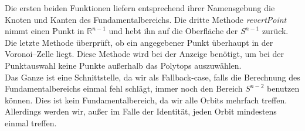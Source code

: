          \noindent Die ersten beiden Funktionen liefern entsprechend ihrer Namensgebung die Knoten und Kanten des Fundamentalbereichs. Die dritte Methode \emph{revertPoint} nimmt einen Punkt in $\mathbb{R}^{n-1}$ und
         hebt ihn auf die Oberfläche der $S^{n-1}$ zurück. Die letzte Methode überprüft, ob ein angegebener Punkt überhaupt in der Voronoi--Zelle liegt.
         Diese Methode wird bei der Anzeige benötigt, um bei der Punktauswahl keine Punkte außerhalb das Polytops auszuwählen.\\

         \noindent Das Ganze ist eine Schnittstelle, da wir als Fallback-case, falls die Berechnung des Fundamentalbereichs einmal fehl schlägt, immer noch 
         den Bereich $S^{n-2}$ benutzen können. Dies ist kein Fundamentalbereich, da wir alle Orbits mehrfach treffen. Allerdings werden wir, außer im Falle
         der Identität, jeden Orbit mindestens einmal treffen.


